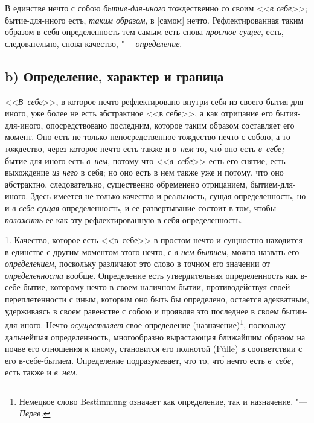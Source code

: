 В единстве нечто с собою {\em бытие-для-иного}
тождественно со своим <<{\em в себе}>>; бытие-для-иного
есть, {\em таким образом}, в [самом] нечто.
Рефлектированная таким образом в себя определенность тем самым есть снова
{\em простое сущее}, есть, следовательно, снова
качество, "--- {\em определение}.

\subsection[b) Определение, характер и граница]{b) Определение, характер и граница}

<<{\em В~себе}>>, в которое нечто рефлектировано внутри
себя из своего бытия-для-иного, уже более не есть абстрактное <<в себе>>, а
как отрицание его бытия-для-иного, опосредствовано последним, которое
таким образом составляет его момент. Оно есть не только непосредственное
тождество нечто с собою, а то тождество, через которое нечто есть также и
{\em в~нем} то, чт\'{о} оно есть {\em в~себе;}
бытие-для-иного есть {\em в~нем}, потому что
<<{\em в~себе}>> есть его снятие, есть выхождение
{\em из него} в себя; но оно есть в нем также уже и
потому, что оно абстрактно, следовательно, существенно обременено
отрицанием, бытием-для-иного. Здесь имеется не только качество и
реальность, сущая определенность, но и
{\em в-себе-сущая} определенность, и ее развертывание
состоит в том, чтобы {\em положить} ее как эту
рефлектированную в себя определенность.

1. Качество, которое есть <<в~себе>>
в простом нечто и сущностно находится
в единстве с другим моментом этого нечто, с
{\em в-нем-бытием}, можно назвать его
{\em определением}, поскольку различают это слово в
точном его значении от {\em определенности} вообще.
Определение есть утвердительная определенность как в-себе-бытие, которому
нечто в своем наличном бытии, противодействуя своей переплетенности с
иным, которым оно быть бы определено, остается адекватным,
удерживаясь в своем равенстве с собою и проявляя это последнее в своем
бытии-для-иного. Нечто {\em осуществляет} свое
определение (назначение)\footnote{Немецкое слово Bestimmung
означает как определение, так и назначение. "--- {\em Перев.}},
поскольку дальнейшая определенность,
многообразно вырастающая ближайшим образом на почве его отношения к
иному, становится его полнотой (Fülle) в соответствии с его
в-себе-бытием. Определение подразумевает, что то, чт\'{о} нечто есть
{\em в~себе}, есть также и {\em в~нем}.

